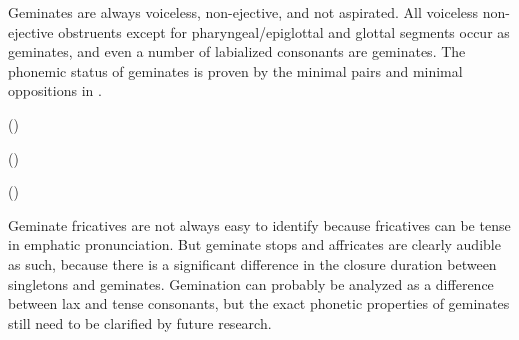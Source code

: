 Geminates are always voiceless, non-ejective, and not aspirated. All voiceless non-ejective obstruents except for pharyngeal/epiglottal and glottal segments occur as geminates, and even a number of labialized consonants are geminates. The phonemic status of geminates is proven by the minimal pairs and minimal oppositions in .
%
\begin{exe}
	\ex	\label{ex:gemination B phon@A}
	\begin{xlist}
\TabPositions{13em}
		\ex	{} 	\tab {} 	
		\ex	{} ()  \tab {} 	\label{ex:buqij phon}
	
		\ex	{} 	\tab {}  \label{ex:busij phon}
		
		\ex	{} ()  \tab {}  	\label{ex:bacij phonA}
		
		\ex	{} ()  \tab {} 	\label{ex:bacij phonB}
		\ex	{}  \tab {} 	\label{ex:hetij phonC}
		
	\end{xlist}
\end{exe}

Geminate fricatives are not always easy to identify because fricatives can be tense in emphatic pronunciation. But geminate stops and affricates are clearly audible as such, because there is a significant difference in the closure duration between singletons and geminates. Gemination can probably be analyzed as a difference between lax and tense consonants, but the exact phonetic properties of geminates still need to be clarified by future research.

